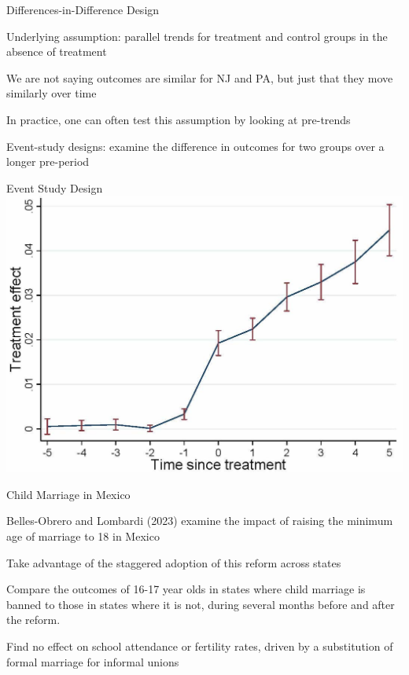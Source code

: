 \documentclass{./../div_teaching_slides}
\begin{document}
\begin{frame}{Differences-in-Difference Design}
\vspace{-0.5em}
\begin{witemize}
  \item Underlying assumption: parallel trends for treatment and control groups in the absence of treatment
  \item We are not saying outcomes are similar for NJ and PA, but just that they move similarly over time
  \item In practice, one can often test this assumption by looking at pre-trends
  \item Event-study designs: examine the difference in outcomes for two groups over a longer pre-period 
  \end{witemize}
\end{frame}


\begin{frame}{Event Study Design}
\centering
\includegraphics[scale=0.75]{event_study.jpeg}
\end{frame}

\begin{frame}{Child Marriage in Mexico}
\vspace{-0.5em}
\begin{witemize}
  \item Belles-Obrero and Lombardi (2023) examine the impact of raising the minimum age of marriage to 18 in Mexico
  \item Take advantage of the staggered adoption of this reform across states
  \item Compare the outcomes of 16-17 year olds in states where child marriage is banned to those in states where it is not, during several months before and after the reform.
  \item Find no effect on school attendance or fertility rates, driven by a substitution of formal marriage for informal unions
\end{witemize}
\end{frame}
\end{document}
